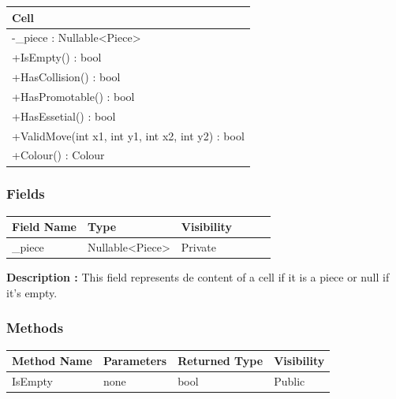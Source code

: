 \documentclass[12pt]{article}
\begin{document}
\begin{table}[H]
    \begin{tabular}{|l|}
    \hline
    \rowcolor[HTML]{C0C0C0} 
    \textbf{Cell}                                    \\ \hline
    \rowcolor[HTML]{EFEFEF}
    -\_piece : Nullable<Piece>                        \\ \hline
    +IsEmpty() : bool                                 \\ \hline
    +HasCollision() : bool                            \\ \hline
    +HasPromotable() : bool                           \\ \hline
    +HasEssetial() : bool                             \\ \hline
    +ValidMove(int x1, int y1, int x2, int y2) : bool \\ \hline
    +Colour() : Colour                                \\ \hline
    \end{tabular}
\end{table}

\subsubsection{Fields}

\begin{table}[H]
    \begin{tabular}{llllll}
    \hline
    \multicolumn{1}{|l|}{\cellcolor[HTML]{EFEFEF}\textbf{Field Name}} & \multicolumn{1}{l|}{\cellcolor[HTML]{EFEFEF}\textbf{Type}} & \multicolumn{1}{l|}{\cellcolor[HTML]{EFEFEF}\textbf{Visibility}} \\ \hline
    \multicolumn{1}{|l|}{\_piece}                                     & \multicolumn{1}{l|}{Nullable<Piece>}                       & \multicolumn{1}{l|}{Private}                                     \\ \hline
    \end{tabular}
\end{table}

\textbf{Description :} This field represents de content of a cell if it is a piece
or null if it's empty.

\subsubsection{Methods}

\begin{table}[H]
    \begin{tabular}{|l|l|l|l|}
    \hline
    \rowcolor[HTML]{EFEFEF} 
    \cellcolor[HTML]{EFEFEF}\textbf{Method Name} & \textbf{Parameters}    & \textbf{Returned Type} & \textbf{Visibility} \\ \hline
    IsEmpty                                      & none                   & bool                   & Public              \\ \hline
    \end{tabular}
\end{table}
\end{document}
